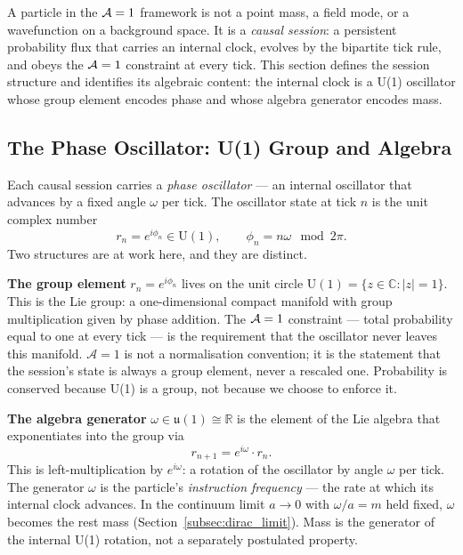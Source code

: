 
\label{sec:causal_sessions}

A particle in the $\mathcal{A}=1$ framework is not a point mass, a field mode,
or a wavefunction on a background space.
It is a \emph{causal session}: a persistent probability flux that
carries an internal clock, evolves by the bipartite tick rule, and
obeys the $\mathcal{A}=1$ constraint at every tick.
This section defines the session structure and identifies its algebraic
content: the internal clock is a U(1) oscillator whose group element encodes
phase and whose algebra generator encodes mass.

\subsection{The Phase Oscillator: U(1) Group and Algebra}
\label{subsec:phase_oscillator}

Each causal session carries a \emph{phase oscillator} --- an internal oscillator
that advances by a fixed angle $\omega$ per tick.
The oscillator state at tick $n$ is the unit complex number
\begin{equation}
    r_n = e^{i\phi_n} \in \mathrm{U}(1), \qquad \phi_n = n\omega \mod 2\pi.
    \label{eq:oscillator_state}
\end{equation}
Two structures are at work here, and they are distinct.

\textbf{The group element} $r_n = e^{i\phi_n}$ lives on the unit circle
$\mathrm{U}(1) = \{z \in \mathbb{C} : |z| = 1\}$.
This is the Lie group: a one-dimensional compact manifold with group
multiplication given by phase addition.
The $\mathcal{A}=1$ constraint --- total probability equal to one at every tick ---
is the requirement that the oscillator never leaves this manifold.
$\mathcal{A} = 1$ is not a normalisation convention; it is the statement
that the session's state is always a group element, never a rescaled one.
Probability is conserved because U(1) is a group, not because we
choose to enforce it.

\textbf{The algebra generator} $\omega \in \mathfrak{u}(1) \cong \mathbb{R}$
is the element of the Lie algebra that exponentiates into the group via
\begin{equation}
    r_{n+1} = e^{i\omega} \cdot r_n.
    \label{eq:oscillator_advance}
\end{equation}
This is left-multiplication by $e^{i\omega}$: a rotation of the oscillator
by angle $\omega$ per tick.
The generator $\omega$ is the particle's \emph{instruction frequency} ---
the rate at which its internal clock advances.
In the continuum limit $a \to 0$ with $\omega/a = m$ held fixed,
$\omega$ becomes the rest mass (Section~\ref{subsec:dirac_limit}).
Mass is the generator of the internal U(1) rotation, not a separately
postulated property.

